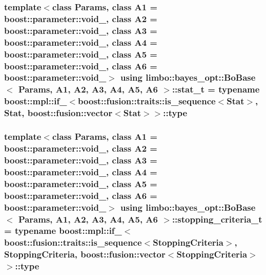 \subsubsection[{stat\+\_\+t}]{\setlength{\rightskip}{0pt plus 5cm}template$<$class Params, class A1 = boost\+::parameter\+::void\+\_\+, class A2 = boost\+::parameter\+::void\+\_\+, class A3 = boost\+::parameter\+::void\+\_\+, class A4 = boost\+::parameter\+::void\+\_\+, class A5 = boost\+::parameter\+::void\+\_\+, class A6 = boost\+::parameter\+::void\+\_\+$>$ using {\bf limbo\+::bayes\+\_\+opt\+::\+Bo\+Base}$<$ Params, A1, A2, A3, A4, A5, A6 $>$\+::{\bf stat\+\_\+t} =  typename boost\+::mpl\+::if\+\_\+$<$boost\+::fusion\+::traits\+::is\+\_\+sequence$<${\bf Stat}$>$, {\bf Stat}, boost\+::fusion\+::vector$<${\bf Stat}$>$$>$\+::type}\label{classlimbo_1_1bayes__opt_1_1_bo_base_a407dede091900c86f4bf8001273c26e2}
\hypertarget{classlimbo_1_1bayes__opt_1_1_bo_base_af3ce6ecc075e643cb1bdde0fb139ce21}{}
\subsubsection[{stopping\+\_\+criteria\+\_\+t}]{\setlength{\rightskip}{0pt plus 5cm}template$<$class Params, class A1 = boost\+::parameter\+::void\+\_\+, class A2 = boost\+::parameter\+::void\+\_\+, class A3 = boost\+::parameter\+::void\+\_\+, class A4 = boost\+::parameter\+::void\+\_\+, class A5 = boost\+::parameter\+::void\+\_\+, class A6 = boost\+::parameter\+::void\+\_\+$>$ using {\bf limbo\+::bayes\+\_\+opt\+::\+Bo\+Base}$<$ Params, A1, A2, A3, A4, A5, A6 $>$\+::{\bf stopping\+\_\+criteria\+\_\+t} =  typename boost\+::mpl\+::if\+\_\+$<$boost\+::fusion\+::traits\+::is\+\_\+sequence$<${\bf Stopping\+Criteria}$>$, {\bf Stopping\+Criteria}, boost\+::fusion\+::vector$<${\bf Stopping\+Criteria}$>$$>$\+::type}\label{classlimbo_1_1bayes__opt_1_1_bo_base_af3ce6ecc075e643cb1bdde0fb139ce21}
\hypertarget{classlimbo_1_1bayes__opt_1_1_bo_base_a313e0d0d1eeceb3d090fbc2aafcc1984}{}
